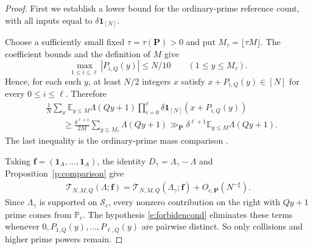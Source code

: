 \documentclass[12pt]{amsart}
\newcommand{\E}{\mathbb E}
\newcommand{\1}{\mathbf 1}
\begin{document}
\begin{proof}
First we establish a lower bound for the ordinary-prime reference
count, with all inputs equal to $\delta\1_{[N]}$.

Choose a sufficiently small fixed $\tau=\tau(\mathbf P)>0$ and put
$M_\tau=\lfloor\tau M\rfloor$. The coefficient bounds and the
definition of $M$ give
\[
 \max_{1\leq i\leq\ell}|P_{i,Q}(y)|\leq N/10
 \qquad(1\leq y\leq M_\tau).
\]
Hence, for each such $y$, at least $N/2$ integers $x$ satisfy
$x+P_{i,Q}(y)\in[N]$ for every $0\leq i\leq\ell$. Therefore
\begin{align}\label{e:model-lower}
 &\frac1N\sum_x\E_{y\leq M}\Lambda(Qy+1)
 \prod_{i=0}^{\ell}\delta\1_{[N]}(x+P_{i,Q}(y))
 \nonumber\\
 &\qquad\geq
 \frac{\delta^{\ell+1}}{2M}\sum_{y\leq M_\tau}\Lambda(Qy+1)
 \gg_{\mathbf P}
 \delta^{\ell+1}\E_{y\leq M}\Lambda(Qy+1).
\end{align}
The last inequality is the ordinary-prime mass comparison
\cite[(5.2)]{KMTT}.

Taking $\mathbf f=(\1_A,\ldots,\1_A)$, the identity
$D_\gamma=\Lambda_\gamma-\Lambda$ and
Proposition~\ref{p:comparison} give
\begin{align}\label{e:comparisonterms}
     \mathcal T_{N,M,Q}(\Lambda;\mathbf f)
 =
 \mathcal T_{N,M,Q}(\Lambda_\gamma;\mathbf f)
 +O_{c,\mathbf P}(N^{-\xi}).
\end{align}
Since $\Lambda_\gamma$ is supported on $\mathcal S_c$, every nonzero
contribution on the right with $Qy+1$ prime comes from $\mathbb P_c$.
The  hypothesis \eqref{e:forbidencond} eliminates these terms whenever
$0,P_{1,Q}(y),\ldots,P_{\ell,Q}(y)$ are pairwise distinct.
So only collisions and higher prime powers remain.


\end{proof}
\end{document}
